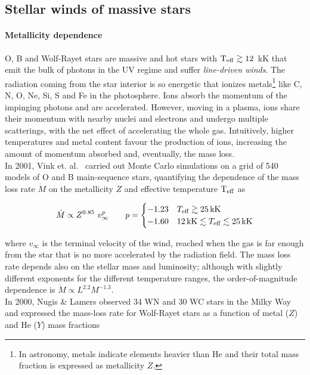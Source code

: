 \documentclass[a4paper,titlepage]{book}     	%
\newcommand{\mdot}{\ensuremath{\dot{M}}}
\begin{document}
\subsection{Stellar winds of massive stars}\label{subsec:stellarwinds}
\paragraph{Metallicity dependence} O, B and Wolf-Rayet stars are massive and hot stars with $\rm T_{\rm eff} \gtrsim 12$~kK that emit the bulk of photons in the UV regime and suffer \emph{line-driven winds}. The radiation coming from the star interior is so energetic that ionizes metals\footnote{In astronomy, metals indicate elements heavier than He and their total mass fraction is expressed as metallicity $Z$.} like C, N, O, Ne, Si, S and Fe in the photosphere. Ions absorb the momentum of the impinging photons and are accelerated. However, moving in a plasma, ions share their momentum with nearby nuclei and electrons and undergo multiple scatterings, with the net effect of accelerating the whole gas. Intuitively, higher temperatures and metal content favour the production of ions, increasing the amount of momentum absorbed and, eventually, the mass loss.\\

In 2001, Vink et. al.\ \cite{Vink2001} carried out Monte Carlo simulations on a grid of 540 models of O and B main-sequence stars, quantifying the dependence of the mass loss rate $\mdot$ on the metallicity $Z$ and effective temperature $\rm T_{\rm eff}$ as

\begin{equation}\label{eq:Vink2001}
\dot{M} \propto Z^{0.85}~v_\infty^p \quad \quad p = 
\begin{cases}
-1.23 & T_\textup{eff} \gtrsim \SI{25}{kK} \\
-1.60 & \SI{12}{kK} \lesssim T_\textup{eff} \lesssim \SI{25}{kK}
\end{cases}
\end{equation}

where $v_\infty$ is the terminal velocity of the wind, reached when the gas is far enough from the star that is no more accelerated by the radiation field. The mass loss rate depends also on the stellar mass and luminosity; although with slightly different exponents for the different temperature ranges, the order-of-magnitude dependence is $\mdot \propto L^{2.2} M^{-1.3}$. \\

In 2000, Nugis \& Lamers \cite{Nugis2000_WRwinds} observed 34 WN and 30 WC stars in the Milky Way and expressed the mass-loss rate for Wolf-Rayet stars as a function of metal ($Z$) and He ($Y$) mass fractions
\end{document}
